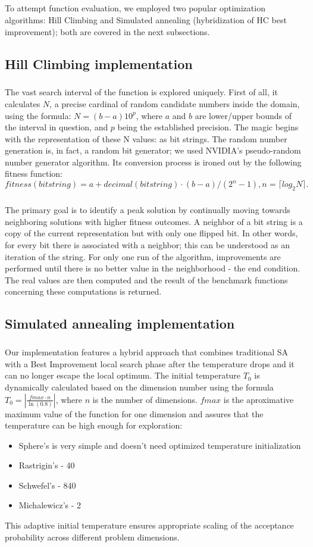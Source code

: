 \documentclass{article}
\newcommand{\ceil}[1]{\lceil #1 \rceil}
\begin{document}
\subparagraph{}
To attempt function evaluation, we employed two popular optimization algorithms: Hill Climbing and Simulated annealing (hybridization of HC best improvement); both are covered in the next subsections.

\subsection{Hill Climbing implementation}

\subparagraph{}
The vast search interval of the function is explored uniquely. First of all, it calculates $N$, a precise cardinal of random candidate numbers inside the domain, using the formula: $ N = (b-a)10^p$,  where $a$ and $b$ are lower/upper bounds of the interval in question, and $p$ being the established precision. The magic begins with the representation of these N values: as bit strings. The random number generation is, in fact, a random bit generator; we used NVIDIA's pseudo-random number generator algorithm. Its conversion process is ironed out by the following fitness function: $$fitness(bitstring) = a + decimal(bitstring) \cdot (b - a) / (2^n - 1), n = \ceil{log_2N} .$$

\subparagraph{}
The primary goal is to identify a peak solution by continually moving towards neighboring solutions with higher fitness outcomes. A neighbor of a bit string is a copy of the current representation but with only one flipped bit. In other words, for every bit there is associated with a neighbor; this can be understood as an iteration of the string. For only one run of the algorithm, improvements are performed until there is no better value in the neighborhood - the end condition. The real values are then computed and the result of the benchmark functions concerning these computations is returned.

\subsection{Simulated annealing implementation}

\subparagraph{}
Our implementation features a hybrid approach that combines traditional SA with a Best Improvement local search phase after the temperature drops and it can no longer escape the local optimum. The initial temperature $T_0$ is dynamically calculated based on the dimension number using the formula $T_0 = \left|\frac{fmax \cdot n}{\ln(0.8)}\right|$, where $n$ is the number of dimensions. $fmax$ is the aproximative maximum value of the function for one dimension and assures that the temperature can be high enough for exploration:
\begin{itemize} 
    \item Sphere's is very simple and doesn't need optimized temperature initialization
    \item Rastrigin's - 40 
    \item Schwefel's - 840 
    \item Michalewicz's - 2 
\end{itemize} 
This adaptive initial temperature ensures appropriate scaling of the acceptance probability across different problem dimensions. 
\end{document}
